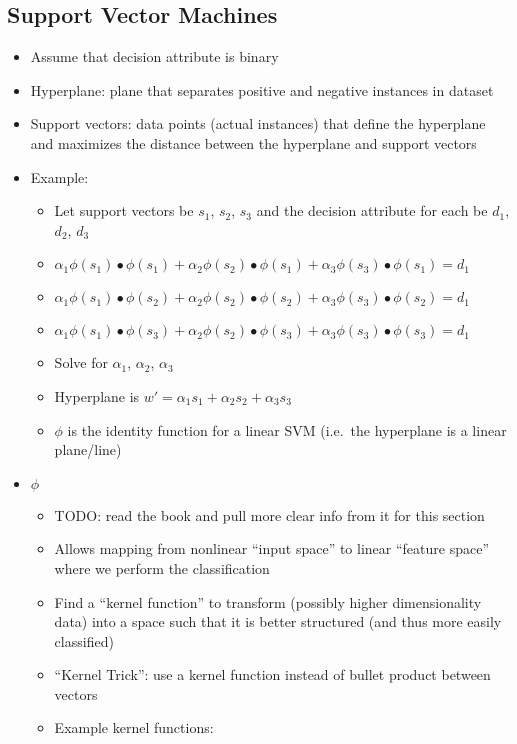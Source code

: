 \documentclass{article}
\begin{document}
\subsection{Support Vector Machines}
\begin{itemize}
	\item Assume that decision attribute is binary
	\item Hyperplane: plane that separates positive and negative instances in dataset
	\item Support vectors: data points (actual instances) that define the hyperplane and maximizes the distance between the hyperplane and support vectors
	\item Example:
		\begin{itemize}
			\item Let support vectors be $s_1$, $s_2$, $s_3$ and the decision attribute for each be $d_1$, $d_2$, $d_3$
			\item $\alpha_1 \phi(s_1) \bullet \phi(s_1) + \alpha_2 \phi(s_2) \bullet \phi(s_1) + \alpha_3 \phi(s_3) \bullet \phi(s_1) = d_1$
			\item $\alpha_1 \phi(s_1) \bullet \phi(s_2) + \alpha_2 \phi(s_2) \bullet \phi(s_2) + \alpha_3 \phi(s_3) \bullet \phi(s_2) = d_1$
			\item $\alpha_1 \phi(s_1) \bullet \phi(s_3) + \alpha_2 \phi(s_2) \bullet \phi(s_3) + \alpha_3 \phi(s_3) \bullet \phi(s_3) = d_1$
			\item Solve for $\alpha_1$, $\alpha_2$, $\alpha_3$
			\item Hyperplane is $w' = \alpha_1 s_1 + \alpha_2 s_2 + \alpha_3 s_3$
			\item $\phi$ is the identity function for a linear SVM (i.e.\ the hyperplane is a linear plane/line)
		\end{itemize}
	\item $\phi$
		\begin {itemize}
		  \item TODO: read the book and pull more clear info from it for this section
			\item Allows mapping from nonlinear ``input space'' to linear ``feature space'' where we perform the classification
			\item Find a ``kernel function'' to transform (possibly higher dimensionality data) into a space such that it is better structured (and thus more easily classified)
			\item ``Kernel Trick'': use a kernel function instead of bullet product between vectors
			\item Example kernel functions:

\end{itemize}
\end{itemize}
\end{document}
